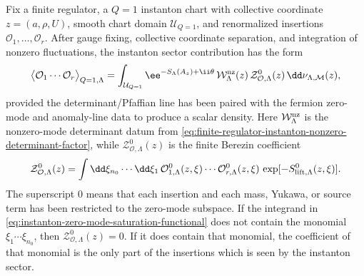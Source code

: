 \begin{proposition}
\label{prop:instanton-sector-physical-correlator-contribution}
Fix a finite regulator, a \(Q=1\) instanton chart with collective coordinate
\(z=(a,\rho,U)\), smooth chart domain \(\mathcal U_{Q=1}\), and
renormalized insertions \(\mathcal O_1,\ldots,\mathcal O_r\).  After gauge
fixing, collective coordinate separation, and integration of nonzero
fluctuations, the instanton sector contribution has the form
\begin{equation}
  \bigl\langle\mathcal O_1\cdots\mathcal O_r\bigr\rangle_{Q=1,\Lambda}
  =
  \int_{\mathcal U_{Q=1}}
  \ee^{-S_\Lambda(A_z)+\ii\theta}\,
  \mathcal W_{\Lambda}^{\rm nz}(z)\,
  \mathcal Z_{\mathcal O,\Lambda}^{0}(z)\,
  \dd\nu_{\Lambda,\mathcal M}(z),
  \label{eq:instanton-physical-correlator-assembly}
\end{equation}
provided the determinant/Pfaffian line has been paired with the fermion
zero-mode and anomaly-line data to produce a scalar density.  Here
\(\mathcal W_{\Lambda}^{\rm nz}\) is the nonzero-mode determinant datum from
\eqref{eq:finite-regulator-instanton-nonzero-determinant-factor}, while
\(\mathcal Z_{\mathcal O,\Lambda}^{0}(z)\) is the finite Berezin coefficient
\begin{equation}
  \mathcal Z_{\mathcal O,\Lambda}^{0}(z)
  =
  \int\dd\xi_{n_0}\cdots\dd\xi_1\,
  \mathcal O_{1,\Lambda}^{0}(z,\xi)\cdots
  \mathcal O_{r,\Lambda}^{0}(z,\xi)\,
  \exp[-S_{\rm lift,\Lambda}^{0}(z,\xi)] .
  \label{eq:instanton-zero-mode-saturation-functional}
\end{equation}
The superscript \(0\) means that each insertion and each mass, Yukawa, or
source term has been restricted to the zero-mode subspace.  If the integrand
in \eqref{eq:instanton-zero-mode-saturation-functional} does not contain the
monomial \(\xi_1\cdots\xi_{n_0}\), then
\(\mathcal Z_{\mathcal O,\Lambda}^{0}(z)=0\).  If it does contain that
monomial, the coefficient of that monomial is the only part of the insertions
which is seen by the instanton sector.
\end{proposition}

